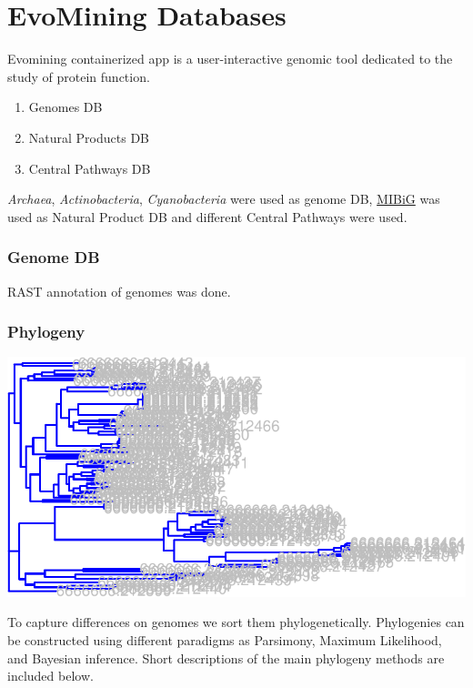 \documentclass[12pt,twoside]{reedthesis}
\providecommand{\tightlist}{%
  \setlength{\itemsep}{0pt}\setlength{\parskip}{0pt}}
\begin{document}
  \section{EvoMining Databases}\label{evomining-databases}
  
  Evomining containerized app is a user-interactive genomic tool dedicated
  to the study of protein function\protect\hyperlink{section}{}.
  
  \begin{enumerate}
  \def\labelenumi{\arabic{enumi}.}
  \tightlist
  \item
    Genomes DB
  \item
    Natural Products DB
  \item
    Central Pathways DB
  \end{enumerate}
  
  \emph{Archaea}, \emph{Actinobacteria}, \emph{Cyanobacteria} were used as
  genome DB, \href{http://mibig.secondarymetabolites.org/}{MIBiG} was used
  as Natural Product DB and different Central Pathways were used.
  
  \subsubsection{Genome DB}\label{genome-db}
  
  RAST annotation of genomes was done.
  
  \subsubsection{Phylogeny}\label{phylogeny}
  
  \begin{center}\includegraphics{tesis_files/figure-latex/testingPhylogeny-1} \end{center}
  
  To capture differences on genomes we sort them phylogenetically.
  Phylogenies can be constructed using different paradigms as Parsimony,
  Maximum Likelihood, and Bayesian inference. Short descriptions of the
  main phylogeny methods are included below.
  
\end{document}
